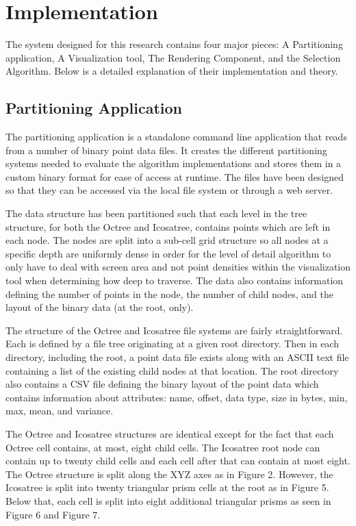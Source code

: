 \chapter{Implementation}

The system designed for this research contains four major pieces: A Partitioning
application, A Visualization tool, The Rendering Component, and the Selection
Algorithm. Below is a detailed explanation of their implementation and theory.

\section{Partitioning Application}

The partitioning application is a standalone command line application that reads
from a number of binary point data files. It creates the different partitioning
systems needed to evaluate the algorithm implementations and stores them in a
custom binary format for ease of access at runtime. The files have been designed
so that they can be accessed via the local file system or through a web server.

The data structure has been partitioned such that each level in the tree
structure, for both the Octree and Icosatree, contains points which are left in
each node. The nodes are split into a sub-cell grid structure so all nodes at a
specific depth are uniformly dense in order for the level of detail algorithm to
only have to deal with screen area and not point densities within the
visualization tool when determining how deep to traverse. The data also contains
information defining the number of points in the node, the number of child
nodes, and the layout of the binary data (at the root, only).

The structure of the Octree and Icosatree file systems are fairly
straightforward. Each is defined by a file tree originating at a given root
directory. Then in each directory, including the root, a point data file exists
along with an ASCII text file containing a list of the existing child nodes at
that location. The root directory also contains a CSV file defining the binary
layout of the point data which contains information about attributes: name,
offset, data type, size in bytes, min, max, mean, and variance.

The Octree and Icosatree structures are identical except for the fact that each
Octree cell contains, at most, eight child cells. The Icosatree root node can
contain up to twenty child cells and each cell after that can contain at most
eight. The Octree structure is split along the XYZ axes as in Figure 2. However,
the Icosatree is split into twenty triangular prism cells at the root as in
Figure 5. Below that, each cell is split into eight additional triangular prisms
as seen in Figure 6 and Figure 7.

